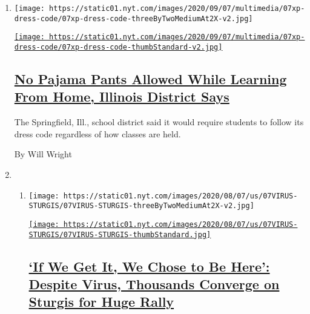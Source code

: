 \begin{enumerate}
\def\labelenumi{\arabic{enumi}.}
\item
  \texttt{[image: https://static01.nyt.com/images/2020/09/07/multimedia/07xp-dress-code/07xp-dress-code-threeByTwoMediumAt2X-v2.jpg]}

  \href{/2020/08/08/us/pajamas-school-springfield-dress-code.html}{\texttt{[image: https://static01.nyt.com/images/2020/09/07/multimedia/07xp-dress-code/07xp-dress-code-thumbStandard-v2.jpg]}}

  \hypertarget{no-pajama-pants-allowed-while-learning-from-home-illinois-district-says}{%
  \subsection{\texorpdfstring{\href{/2020/08/08/us/pajamas-school-springfield-dress-code.html}{No
  Pajama Pants Allowed While Learning From Home, Illinois District
  Says}}{No Pajama Pants Allowed While Learning From Home, Illinois District Says}}\label{no-pajama-pants-allowed-while-learning-from-home-illinois-district-says}}

  The Springfield, Ill., school district said it would require students
  to follow its dress code regardless of how classes are held.

  By Will Wright
\item
  \begin{enumerate}
  \def\labelenumii{\arabic{enumii}.}
  \item
    \texttt{[image: https://static01.nyt.com/images/2020/08/07/us/07VIRUS-STURGIS/07VIRUS-STURGIS-threeByTwoMediumAt2X-v2.jpg]}

    \href{/2020/08/07/us/sturgis-motorcyle-rally.html}{\texttt{[image: https://static01.nyt.com/images/2020/08/07/us/07VIRUS-STURGIS/07VIRUS-STURGIS-thumbStandard.jpg]}}

    \hypertarget{if-we-get-it-we-chose-to-be-here-despite-virus-thousands-converge-on-sturgis-for-huge-rally}{%
    \subsection{\texorpdfstring{\href{/2020/08/07/us/sturgis-motorcyle-rally.html}{`If
    We Get It, We Chose to Be Here': Despite Virus, Thousands Converge
    on Sturgis for Huge
    Rally}}{`If We Get It, We Chose to Be Here': Despite Virus, Thousands Converge on Sturgis for Huge Rally}}\label{if-we-get-it-we-chose-to-be-here-despite-virus-thousands-converge-on-sturgis-for-huge-rally}}


\end{enumerate}
\end{enumerate}
